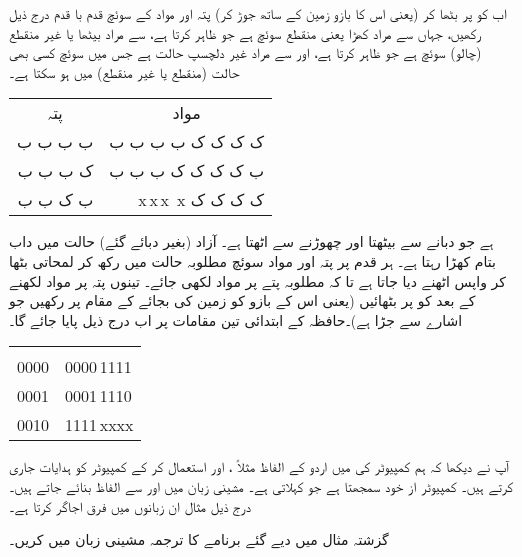 اب  کو   پر بٹھا کر     (یعنی اس کا بازو  زمین کے ساتھ جوڑ کر) پتہ  اور مواد کے  سوئچ    قدم با قدم   درج ذیل رکھیں، جہاں  سے مراد  کھڑا   یعنی منقطع  سوئچ ہے جو  ظاہر کرتا ہے،   سے مراد بیٹھا یا غیر منقطع (چالو) سوئچ ہے  جو     ظاہر کرتا ہے، اور  سے مراد  غیر دلچسپ حالت ہے  جس میں    سوئچ کسی بھی حالت (منقطع یا غیر منقطع)    میں ہو سکتا ہے۔
\begin{center}
\begin{tabular}{rr}
\multicolumn{1}{c}{پتہ}& \multicolumn{1}{c}{مواد}\\[1ex]
ب ب ب ب & ک ک ک ک   ب ب ب ب\\
ک ب ب ب & ب ک ک ک  ک ب ب ب\\
ب ک ب ب & \,\,\,\,\,
 x\,\quad  x\,\quad  x\, \quad x \quad
  ک ک ک ک
\end{tabular}
\end{center}

 ہے جو    دبانے سے بیٹھتا   اور چھوڑنے سے اٹھتا ہے۔ آزاد   (بغیر دبائے گئے)  حالت میں  داب بتام کھڑا رہتا ہے۔  ہر قدم پر  پتہ اور  مواد سوئچ  مطلوبہ حالت میں رکھ کر    لمحاتی بٹھا کر  واپس اٹھنے دیا جاتا ہے تا کہ مطلوبہ پتے پر مواد لکھی جائے۔ تینوں پتہ پر مواد لکھنے کے بعد  کو     پر بٹھائیں (یعنی  اس کے بازو کو  زمین کی بجائے  کے مقام پر رکھیں جو  اشارے سے جڑا ہے)۔حافظہ کے ابتدائی تین  مقامات پر اب درج ذیل پایا جائے گا۔
\begin{center}
\begin{tabular}{LL}
& \\[1ex]
0000&0000\,1111\\
0001&0001\,1110\\
0010&1111\,xxxx
\end{tabular}
\end{center}

آپ نے دیکھا کہ ہم کمپیوٹر کی  میں اردو  کے الفاظ مثلاً  ، اور   استعمال کر کے کمپیوٹر  کو ہدایات جاری کرتے ہیں۔ کمپیوٹر از خود  سمجھتا ہے جو       کہلاتی ہے۔  مشینی  زبان میں   اور   سے الفاظ بنائے جاتے ہیں۔ درج ذیل مثال  ان  زبانوں میں فرق اجاگر کرتا ہے۔

گزشتہ مثال میں دیے گئے  برنامے کا ترجمہ مشینی  زبان میں کریں۔

